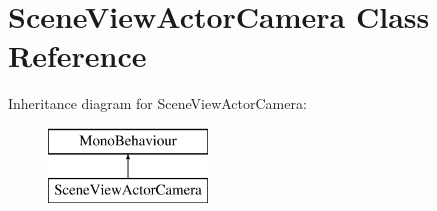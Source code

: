 \hypertarget{class_scene_view_actor_camera}{}\section{Scene\+View\+Actor\+Camera Class Reference}
\label{class_scene_view_actor_camera}
Inheritance diagram for Scene\+View\+Actor\+Camera\+:\begin{figure}[H]
\begin{center}
\leavevmode
\includegraphics[height=2.000000cm]{class_scene_view_actor_camera}
\end{center}
\end{figure}
